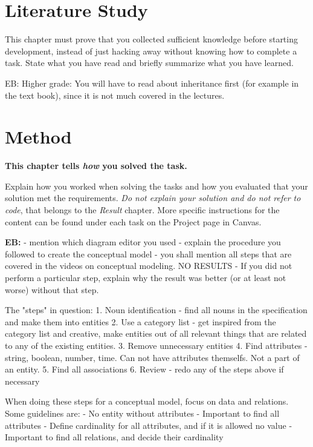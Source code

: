 \documentclass[a4paper]{scrartcl}
\begin{document}
\section{Literature Study}

This chapter must prove that you collected sufficient knowledge before starting
development, instead of just hacking away without knowing how to complete a
task. State what you have read and briefly summarize what you have learned.

EB:
Higher grade:
You will have to read about inheritance first (for example in the text book), since it is not much covered in the lectures. 

\section{Method}

\textbf{This chapter tells \textit{how} you solved the task.}

Explain how you worked when solving the tasks and how you evaluated that your
solution met the requirements. \textit{Do not explain your solution and do not
refer to code}, that belongs to the \textit{Result} chapter. More specific
instructions for the content can be found under each task on the Project page in
Canvas.

\textbf{EB:}
- mention which diagram editor you used
- explain the procedure you followed to create the conceptual model
- you shall mention all steps that are covered in the videos on conceptual modeling. NO RESULTS
- If you did not perform a particular step, explain why the result was better (or at least not worse) without that step. 

The "steps" in question: 
1. Noun identification - find all nouns in the specification and make them into entities
2. Use a category list - get inspired from the category list and creative, make entities out of all relevant things that are related to any of the existing entities.
3. Remove unnecessary entities
4. Find attributes - string, boolean, number, time. Can not have attributes themselfs. Not a part of an entity.
5. Find all associations 
6. Review - redo any of the steps above if necessary 

When doing these steps for a conceptual model, focus on data and relations. Some guidelines are: 
- No entity without attributes
- Important to find all attributes
- Define cardinality for  all attributes, and if it is allowed no value
- Important to find all relations, and decide their cardinality
\end{document}
